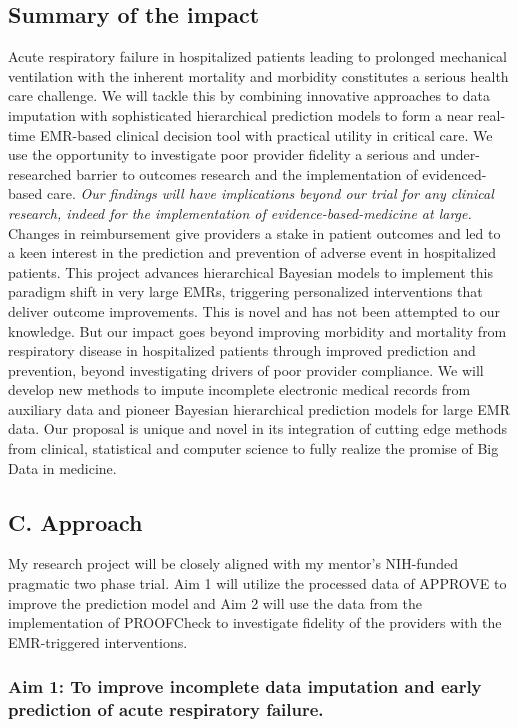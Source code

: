 \documentclass[11pt,notitlepage]{article}
\begin{document}
\subsection*{Summary of the impact}
Acute respiratory failure in hospitalized patients leading to prolonged mechanical ventilation with the inherent mortality and morbidity constitutes a serious health care challenge. We will tackle this by combining innovative approaches to data imputation with sophisticated hierarchical prediction models to form a near real-time EMR-based clinical decision tool with practical utility in critical care. We use the opportunity to investigate poor provider fidelity a serious and under-researched barrier to outcomes research and the implementation of evidenced-based care. \textit{Our findings will have implications beyond our trial for any clinical research, indeed for the implementation of evidence-based-medicine at large.} Changes in reimbursement give providers a stake in patient outcomes and led to a keen interest in the prediction and prevention of adverse event in hospitalized patients. This project advances hierarchical Bayesian models to implement this paradigm shift in very large EMRs, triggering personalized interventions that deliver outcome improvements. This is novel and has not been attempted to our knowledge. But our impact goes beyond improving morbidity and mortality from respiratory disease in hospitalized patients through improved prediction and prevention, beyond investigating drivers of poor provider compliance. We will develop new methods to impute incomplete electronic medical records from auxiliary data and pioneer Bayesian hierarchical prediction models for large EMR data. Our proposal is unique and novel in its integration of cutting edge methods from clinical, statistical and computer science to fully realize the promise of Big Data in medicine.

\subsection*{C. Approach}
My research project will be closely aligned with my mentor's NIH-funded pragmatic two phase trial. Aim 1 will utilize the processed data of APPROVE to improve the prediction model and Aim 2 will use the data from the implementation of PROOFCheck to investigate fidelity of the providers with the EMR-triggered interventions.

\subsubsection*{Aim 1: To improve incomplete data imputation and early prediction of acute respiratory failure.}
\end{document}
